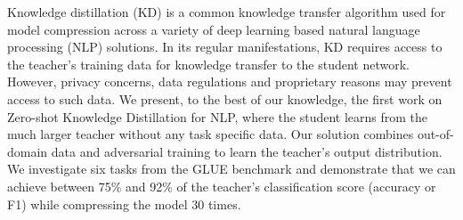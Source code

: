 Knowledge distillation (KD) is a common knowledge transfer algorithm used for model compression across a variety of deep learning based natural language processing (NLP) solutions. In its regular manifestations, KD requires access to the teacher's training data for knowledge transfer to the student network. However, privacy concerns, data regulations and proprietary reasons may prevent access to such data. We present, to the best of our knowledge, the first work on Zero-shot Knowledge Distillation for NLP, where the student learns from the much larger teacher without any task specific data. Our solution combines out-of-domain data and adversarial training to learn the teacher's output distribution. We investigate six tasks from the GLUE benchmark and demonstrate that we can achieve between 75\% and 92\% of the teacher's classification score (accuracy or F1) while compressing the model 30 times.

